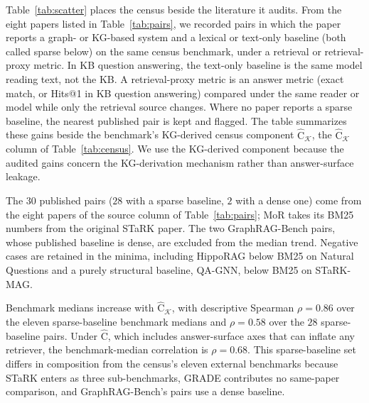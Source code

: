 \documentclass[11pt]{article}
\newcommand{\Chat}{\widehat{\mathrm{C}}}
\newcommand{\kg}{\mathcal{K}}
\begin{document}
Table~\ref{tab:scatter} places the census beside the literature it audits. From the eight papers listed in Table~\ref{tab:pairs}, we recorded pairs in which the paper reports a graph- or KG-based system and a lexical or text-only baseline (both called sparse below) on the same census benchmark, under a retrieval or retrieval-proxy metric. In KB question answering, the text-only baseline is the same model reading text, not the KB. A retrieval-proxy metric is an answer metric (exact match, or Hits@1 in KB question answering) compared under the same reader or model while only the retrieval source changes. Where no paper reports a sparse baseline, the nearest published pair is kept and flagged. The table summarizes these gains beside the benchmark's KG-derived census component $\Chat_{\kg}$, the $\Chat_{\kg}$ column of Table~\ref{tab:census}. We use the KG-derived component because the audited gains concern the KG-derivation mechanism rather than answer-surface leakage.

The $30$ published pairs ($28$ with a sparse baseline, $2$ with a dense one) come from the eight papers of the source column of Table~\ref{tab:pairs}; MoR takes its BM25 numbers from the original STaRK paper. The two GraphRAG-Bench pairs, whose published baseline is dense, are excluded from the median trend. Negative cases are retained in the minima, including HippoRAG below BM25 on Natural Questions and a purely structural baseline, QA-GNN, below BM25 on STaRK-MAG.

Benchmark medians increase with $\Chat_{\kg}$, with descriptive Spearman $\rho=0.86$ over the eleven sparse-baseline benchmark medians and $\rho=0.58$ over the $28$ sparse-baseline pairs. Under $\Chat$, which includes answer-surface axes that can inflate any retriever, the benchmark-median correlation is $\rho=0.68$. This sparse-baseline set differs in composition from the census's eleven external benchmarks because STaRK enters as three sub-benchmarks, GRADE contributes no same-paper comparison, and GraphRAG-Bench's pairs use a dense baseline.
\end{document}
